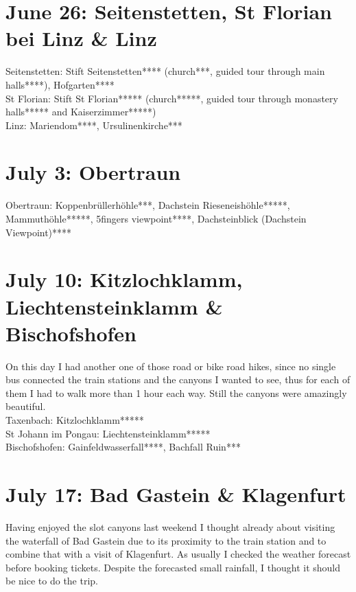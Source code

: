 {\section{June 26: Seitenstetten, St Florian bei Linz \& Linz}
\label{2021SeitenstettenStFlorian}

Seitenstetten: Stift Seitenstetten**** (church***, guided tour through main halls****), Hofgarten****\\
St Florian: Stift St Florian***** (church*****, guided tour through monastery halls***** and Kaiserzimmer*****)\\
Linz: Mariendom****, Ursulinenkirche***\\

\section{July 3: Obertraun}
\label{2021Obertraun}

Obertraun: Koppenbr\"ullerh\"ohle***, Dachstein Rieseneish\"ohle*****, Mammuth\"ohle*****, 5fingers viewpoint****, Dachsteinblick (Dachstein Viewpoint)****

\section{July 10: Kitzlochklamm, Liechtensteinklamm \& Bischofshofen}
\label{2021Pongau}

On this day I had another one of those road or bike road hikes, since no single bus connected the train stations and the canyons I wanted to see, thus for each of them I had to walk more than 1 hour each way. Still the canyons were amazingly beautiful.\\

Taxenbach: Kitzlochklamm*****\\
St Johann im Pongau: Liechtensteinklamm*****\\
Bischofshofen: Gainfeldwasserfall****, Bachfall Ruin***

\section{July 17: Bad Gastein \& Klagenfurt}
\label{2021GasteinKlagenfurt}

Having enjoyed the slot canyons last weekend I thought already about visiting the waterfall of Bad Gastein due to its proximity to the train station and to combine that with a visit of Klagenfurt. As usually I checked the weather forecast before booking tickets. Despite the forecasted small rainfall, I thought it should be nice to do the trip.\\

}
